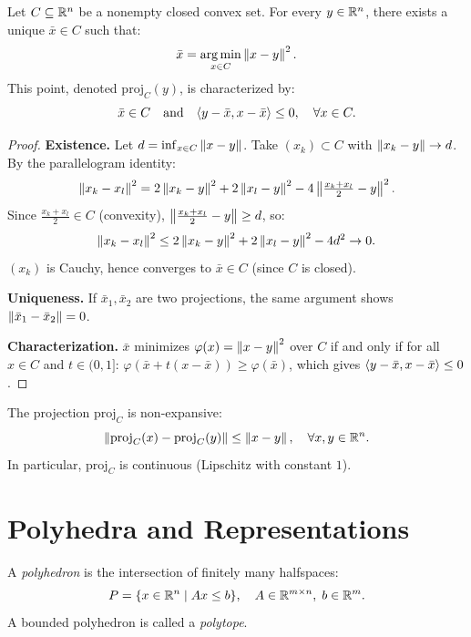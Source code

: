 \begin{theorem}
\label{thm:projection}
Let $C \subseteq \mathbb{R}^n$ be a nonempty closed convex set. For every $y \in \mathbb{R}^n$,
there exists a unique $\bar{x} \in C$ such that:
\[
    \bar{x} = \operatorname*{arg\,min}_{x \in C} \left\| x - y \right\|^2.
\]
This point, denoted $\mathrm{proj}_C(y)$, is characterized by:
\[
    \bar{x} \in C \quad \text{and} \quad
    \langle y - \bar{x}, x - \bar{x} \rangle \leq 0, \quad \forall x \in C.
\]
\end{theorem}

\begin{proof}
\textbf{Existence.} Let $d = \inf_{x \in C} \left\| x - y \right\|$. Take $(x_k) \subset C$
with $\left\| x_k - y \right\| \to d$. By the parallelogram identity:
\[
    \left\| x_k - x_l \right\|^2 = 2\left\| x_k - y \right\|^2 + 2\left\| x_l - y \right\|^2 - 4\left\| \tfrac{x_k+x_l}{2} - y \right\|^2.
\]
Since $\frac{x_k+x_l}{2} \in C$ (convexity), $\left\| \frac{x_k+x_l}{2} - y \right\| \geq d$, so:
\[
    \left\| x_k - x_l \right\|^2 \leq 2\left\| x_k - y \right\|^2 + 2\left\| x_l - y \right\|^2 - 4d^2 \to 0.
\]
$(x_k)$ is Cauchy, hence converges to $\bar{x} \in C$ (since $C$ is closed).

\textbf{Uniqueness.} If $\bar{x}_1, \bar{x}_2$ are two projections, the same argument
shows $\left\| \bar{x}_1 - \bar{x}_2 \right\| = 0$.

\textbf{Characterization.} $\bar{x}$ minimizes $\varphi(x) = \left\| x-y \right\|^2$ over $C$
if and only if for all $x \in C$ and $t \in (0,1]$:
$\varphi(\bar{x} + t(x-\bar{x})) \geq \varphi(\bar{x})$, which gives
$\langle y - \bar{x}, x - \bar{x} \rangle \leq 0$.
\end{proof}

\begin{proposition}
The projection $\mathrm{proj}_C$ is non-expansive:
\[
    \left\| \mathrm{proj}_C(x) - \mathrm{proj}_C(y) \right\| \leq \left\| x - y \right\|, \quad \forall x, y \in \mathbb{R}^n.
\]
In particular, $\mathrm{proj}_C$ is continuous (Lipschitz with constant $1$).
\end{proposition}

\section{Polyhedra and Representations}

\begin{definition}[Polyhedron]
A \emph{polyhedron} is the intersection of finitely many halfspaces:
\[
    P = \{x \in \mathbb{R}^n \mid Ax \leq b\}, \quad A \in \mathbb{R}^{m \times n}, \; b \in \mathbb{R}^m.
\]
A bounded polyhedron is called a \emph{polytope}.
\end{definition}


